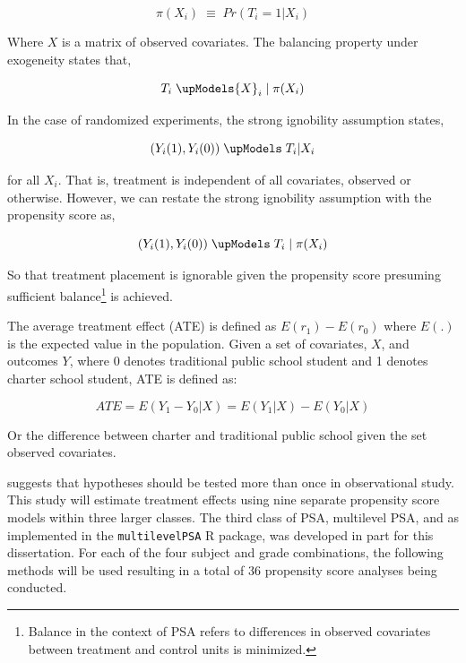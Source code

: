 \documentclass[letterpaper,12p,twoside]{article} %
\begin{document}
$$\pi ({ X }_{ i }) \; \equiv \; Pr({ T }_{ i } = 1 | { X }_{ i })$$

\noindent Where $X$ is a matrix of observed covariates. The balancing property under exogeneity states that,

$${ T }_{ i } \; \upModels { X }_{ i } \;| \; \pi ({ X }_{ i })$$

\noindent In the case of randomized experiments, the strong ignobility assumption states,

$$({ Y }_{ i }(1),{ Y }_{ i }(0)) \; \upModels \; { T }_{ i }|{ X }_{ i }$$

\noindent for all ${X}_{i}$. That is, treatment is independent of all covariates, observed or otherwise. However, we can restate the strong ignobility assumption with the propensity score as,

$$({ Y }_{ i }(1),{ Y }_{ i }(0)) \; \upModels \; { T }_{ i } \; | \; \pi({ X }_{ i })$$

\noindent So that treatment placement is ignorable given the propensity score presuming sufficient balance\footnote{Balance in the context of PSA refers to differences in observed covariates between treatment and control units is minimized.} is achieved.

The average treatment effect (ATE) is defined as $E(r_1) - E(r_0)$ where $E(.)$ is the expected value in the population. Given a set of covariates, $X$, and outcomes $Y$, where 0 denotes traditional public school student and 1 denotes charter school student, ATE is defined as:

$$ATE=E(Y_{1}-Y_{0}|X)=E(Y_{1}|X)-E(Y_{0}|X)$$
 
\noindent Or the difference between charter and traditional public school given the set observed covariates.

 suggests that hypotheses should be tested more than once in observational study. This study will estimate treatment effects using nine separate propensity score models within three larger classes. The third class of PSA, multilevel PSA, and as implemented in the \texttt{multilevelPSA} R package, was developed in part for this dissertation. For each of the four subject and grade combinations, the following methods will be used resulting in a total of 36 propensity score analyses being conducted.
\end{document}
